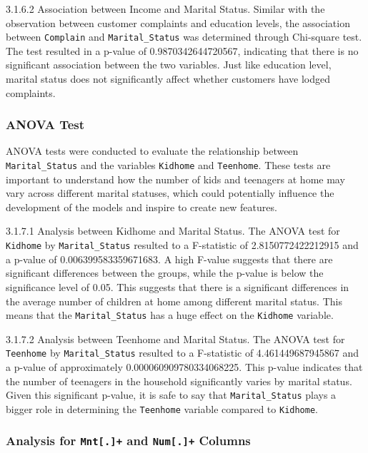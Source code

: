     3.1.6.2 Association between Income and Marital Status. Similar with the observation between customer complaints and education levels, the association between \texttt{Complain} and \texttt{Marital\_Status} was determined through Chi-square test. The test resulted in a p-value of 0.9870342644720567, indicating that there is no significant association between the two variables. Just like education level, marital status does not significantly affect whether customers have lodged complaints.

\subsubsection{ANOVA Test}

ANOVA tests were conducted to evaluate the relationship between \texttt{Marital\_Status} and the variables \texttt{Kidhome} and \texttt{Teenhome}. These tests are important to understand how the number of kids and teenagers at home may vary across different marital statuses, which could potentially influence the development of the models and inspire to create new features.

    3.1.7.1 Analysis between Kidhome and Marital Status. The ANOVA test for \texttt{Kidhome} by \texttt{Marital\_Status} resulted to a F-statistic of 2.8150772422212915 and a p-value of 0.006399583359671683. A high F-value suggests that there are significant differences between the groups, while the p-value is below the significance level of 0.05. This suggests that there is a significant differences in the average number of children at home among different marital status. This means that the \texttt{Marital\_Status} has a huge effect on the \texttt{Kidhome} variable.

    3.1.7.2 Analysis between Teenhome and Marital Status. The ANOVA test for \texttt{Teenhome} by \texttt{Marital\_Status} resulted to a F-statistic of 4.461449687945867 and a p-value of approximately 0.000060909780334068225. This p-value indicates that the number of teenagers in the household significantly varies by marital status. Given this significant p-value, it is safe to say that \texttt{Marital\_Status} plays a bigger role in determining the \texttt{Teenhome} variable compared to \texttt{Kidhome}. 

\subsubsection{Analysis for \texttt{Mnt[.]+} and \texttt{Num[.]+} Columns}

